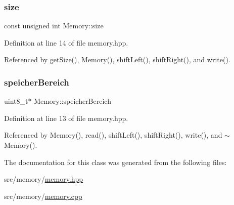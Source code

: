 \subsubsection{\texorpdfstring{size}{size}}
{\footnotesize\ttfamily const unsigned int Memory\+::size\hspace{0.3cm}{\ttfamily [private]}}



Definition at line 14 of file memory.\+hpp.



Referenced by get\+Size(), Memory(), shift\+Left(), shift\+Right(), and write().

\mbox{\label{class_memory_a31e171332b705e39bb13e421c7863a5f}} 
\subsubsection{\texorpdfstring{speicher\+Bereich}{speicherBereich}}
{\footnotesize\ttfamily uint8\+\_\+t$\ast$ Memory\+::speicher\+Bereich\hspace{0.3cm}{\ttfamily [private]}}



Definition at line 13 of file memory.\+hpp.



Referenced by Memory(), read(), shift\+Left(), shift\+Right(), write(), and $\sim$\+Memory().



The documentation for this class was generated from the following files\+:\begin{DoxyCompactItemize}
\item 
src/memory/\mbox{\hyperlink{memory_8hpp}{memory.\+hpp}}\item 
src/memory/\mbox{\hyperlink{memory_8cpp}{memory.\+cpp}}\end{DoxyCompactItemize}
